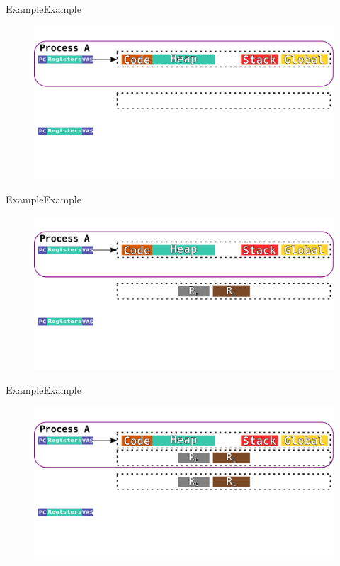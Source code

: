 \documentclass[10pt]{beamer}
\begin{document}
\begin{frame}{Example}{Example}
  \begin{figure}[ht]
    \centering
    \includegraphics[width=1\textwidth, keepaspectratio=true]{images/spacejmp_example_c.png}
  \end{figure}
\end{frame}

\begin{frame}{Example}{Example}
  \begin{figure}[ht]
    \centering
    \includegraphics[width=1\textwidth, keepaspectratio=true]{images/spacejmp_example_d.png}
  \end{figure}
\end{frame}

\begin{frame}{Example}{Example}
  \begin{figure}[ht]
    \centering
    \includegraphics[width=1\textwidth, keepaspectratio=true]{images/spacejmp_example_e.png}
  \end{figure}
\end{frame}
\end{document}
